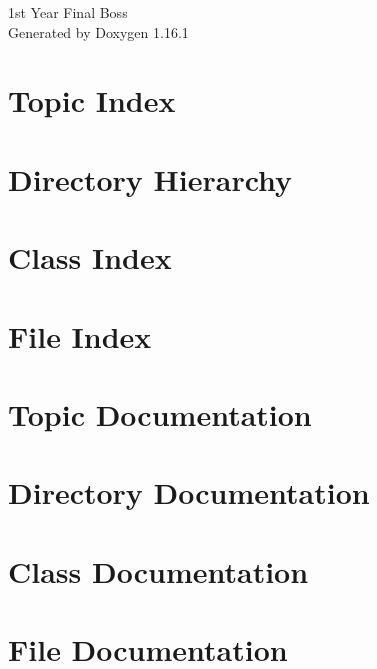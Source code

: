 \documentclass[twoside]{book}
\newcommand{\+}{\discretionary{\mbox{\scriptsize$\hookleftarrow$}}{}{}}
\newcommand{\clearemptydoublepage}{%
    \newpage{\pagestyle{empty}\cleardoublepage}%
  }
\begin{document}
  \raggedbottom
    \hypersetup{pageanchor=false,
                bookmarksnumbered=true,
                pdfencoding=unicode
               }
  \begin{titlepage}
  \vspace*{7cm}
  \begin{center}%
  {\Large 1st Year Final Boss}\\
  \vspace*{1cm}
  {\large Generated by Doxygen 1.16.1}\\
  \end{center}
  \end{titlepage}
  \clearemptydoublepage
  \tableofcontents
  \clearemptydoublepage
  \hypersetup{pageanchor=true}
\chapter{Topic Index}

\chapter{Directory Hierarchy}

\chapter{Class Index}

\chapter{File Index}

\chapter{Topic Documentation}




\chapter{Directory Documentation}

\chapter{Class Documentation}

\chapter{File Documentation}










  \backmatter
  \newpage
  \clearemptydoublepage
  \printindex
\end{document}
